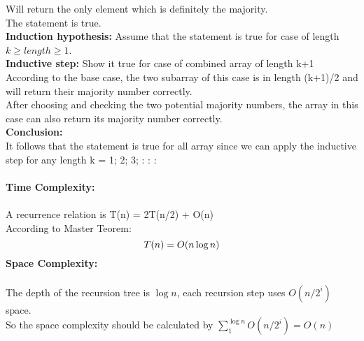 \documentclass{article}
\begin{document}
Will return the only element which is definitely the majority.\\
The statement is true.\\
\textbf{Induction hypothesis:} Assume that the statement is true for case of length $k\ge length \ge 1$.\\
\textbf{Inductive step:} Show it true for case of combined array of length k+1\\
According to the base case, the two subarray of this case is in length (k+1)/2 and will return their majority number correctly.\\
After choosing and checking the two potential majority numbers, the array in this case can also return its majority number correctly.\\
\textbf{Conclusion:}\\
It follows that the statement is true for all array since we can apply the inductive step for any length k = 1; 2; 3; : : :\\\\
\textbf{\large Time Complexity:}\\\\
A recurrence relation is T(n) = 2T(n/2) + O(n)\\
According to Master Teorem:
$$
T(n)=O (n\log n)\\
$$
\textbf{\large Space Complexity:}\\\\
The depth of the recursion tree is $\log n$, each recursion step uses $O(n/2^i)$ space.\\
So the space complexity should be calculated by $\sum_1^{\log n} O(n/{2^i})=O(n)$
\end{document}

